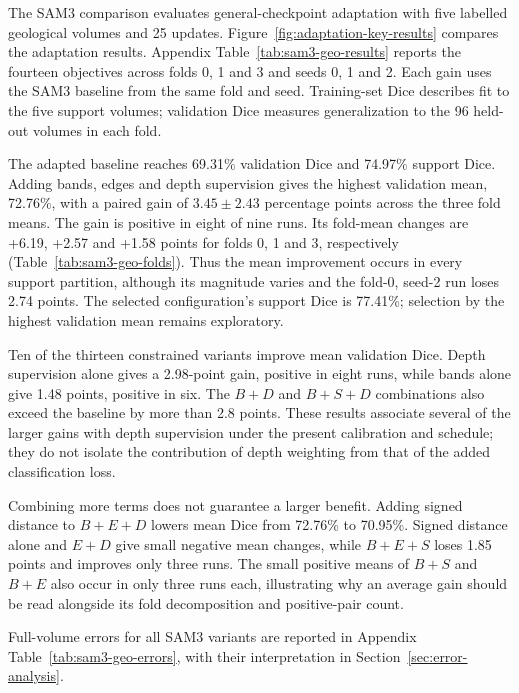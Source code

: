 \documentclass[12pt,a4paper]{article}
\begin{document}
The SAM3 comparison evaluates general-checkpoint adaptation with five
labelled geological volumes and 25 updates. Figure~\ref{fig:adaptation-key-results}
compares the adaptation results. Appendix Table~\ref{tab:sam3-geo-results}
reports the fourteen objectives across folds 0, 1 and 3 and seeds 0, 1
and 2. Each gain uses the SAM3 baseline from the same fold and seed.
Training-set Dice describes fit to the five support volumes; validation
Dice measures generalization to the 96 held-out volumes in each fold.


The adapted baseline reaches 69.31\% validation Dice and 74.97\%
support Dice. Adding bands, edges and depth supervision gives the
highest validation mean, 72.76\%, with a paired gain of
$3.45\pm2.43$ percentage points across the three fold means.
The gain is positive in eight of nine runs. Its fold-mean changes are
+6.19, +2.57 and +1.58 points for folds 0, 1 and 3, respectively
(Table~\ref{tab:sam3-geo-folds}). Thus the mean improvement occurs
in every support partition, although its magnitude varies and the
fold-0, seed-2 run loses 2.74 points. The selected configuration's
support Dice is 77.41\%; selection by the highest validation mean
remains exploratory.

Ten of the thirteen constrained variants improve mean validation Dice.
Depth supervision alone gives a 2.98-point gain, positive in eight
runs, while bands alone give 1.48 points, positive in six. The
$B+D$ and $B+S+D$ combinations also exceed the baseline by more
than 2.8 points. These results associate several of the larger gains
with depth supervision under the present calibration and schedule;
they do not isolate the contribution of depth weighting from that
of the added classification loss.

Combining more terms does not guarantee a larger benefit. Adding
signed distance to $B+E+D$ lowers mean Dice from 72.76\% to
70.95\%. Signed distance alone and $E+D$ give small negative
mean changes, while $B+E+S$ loses 1.85 points and improves only
three runs. The small positive means of $B+S$ and $B+E$ also
occur in only three runs each, illustrating why an average gain
should be read alongside its fold decomposition and positive-pair count.

Full-volume errors for all SAM3 variants are reported in
Appendix Table~\ref{tab:sam3-geo-errors}, with their interpretation in
Section~\ref{sec:error-analysis}.

\end{document}
